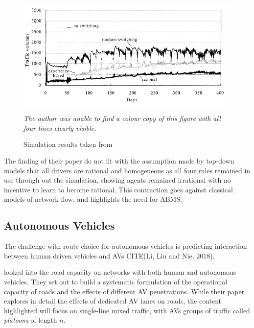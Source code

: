 \documentclass[12pt, a4paper, onecolumn]{article}
\begin{document}
\begin{figure}[h]
	\centering
	\includegraphics[scale=1]{route_rules.png}
	\caption{Simulation results taken from \cite{Nakayama2001}}
	\textit{The author was unable to find a colour copy of this figure with all four lines clearly visible.}
	\label{fig:routerules}
	\end{figure}

The finding of their paper do not fit with the assumption made by top-down models that all drivers are rational and homogeneous as all four rules remained in use through out the simulation, showing agents remained irrational with no incentive to learn to become rational. This contraction goes against classical models of network flow, and highlights the need for ABMS.

\subsection{Autonomous Vehicles}
The challenge with route choice for autonomous vehicles is predicting interaction between human driven vehicles and AVs CITE(Li, Liu and Nie, 2018).

\cite{chen2017} looked into the road capacity on networks with both human and autonomous vehicles. They set out to build a systematic formulation of the operational capacity of roads and the effects of different AV penetrations. While their paper explores in detail the effects of dedicated AV lanes on roads, the content highlighted will focus on single-line mixed traffic, with AVs groups of traffic called \textit{platoons} of length $n$. 
\end{document}
